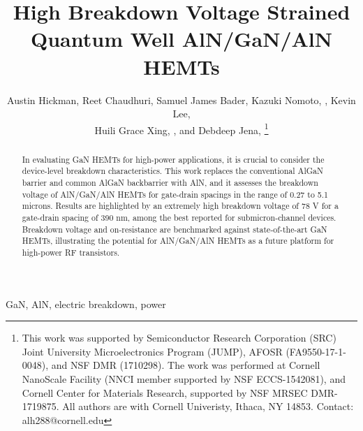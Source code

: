 \documentclass[journal]{IEEEtran}
\newif\ifarxiv
\begin{document}
\title{High Breakdown Voltage Strained Quantum Well AlN/GaN/AlN HEMTs}

\author{Austin Hickman, Reet Chaudhuri, Samuel James Bader, Kazuki Nomoto, , Kevin Lee, \\ Huili Grace Xing, , and Debdeep Jena, %
\thanks{
  This work was supported by Semiconductor Research Corporation (SRC) Joint University Microelectronics Program (JUMP), AFOSR (FA9550-17-1-0048), and NSF DMR (1710298). The work was performed at Cornell NanoScale Facility (NNCI member supported by NSF ECCS-1542081), and Cornell Center for Materials Research, supported by NSF MRSEC DMR-1719875. All authors are with Cornell Univeristy, Ithaca, NY 14853. Contact: alh288@cornell.edu }}

\ifarxiv \else
{}%
{}
\fi
% 

\maketitle

\begin{abstract}
In evaluating GaN HEMTs for high-power applications, it is crucial to consider the device-level breakdown characteristics. This work replaces the conventional AlGaN barrier and common AlGaN backbarrier with AlN, and it assesses the breakdown voltage of AlN/GaN/AlN HEMTs for gate-drain spacings in the range of 0.27 to 5.1 microns. Results are highlighted by an extremely high breakdown voltage of 78 V for a gate-drain spacing of 390 nm, among the best reported for submicron-channel devices. Breakdown voltage and on-resistance are benchmarked against state-of-the-art GaN HEMTs, illustrating the potential for AlN/GaN/AlN HEMTs as a future platform for high-power RF transistors.
\end{abstract}

\begin{IEEEkeywords}
  GaN, AlN, electric breakdown, power
\end{IEEEkeywords}
\end{document}
